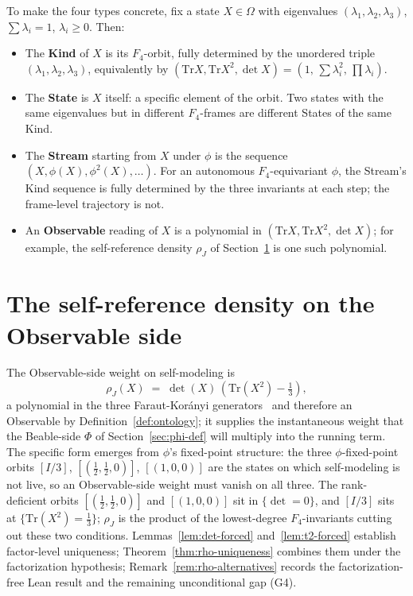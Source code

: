 \documentclass[12pt]{article}
\theoremstyle{remark}
\newcommand{\Ffour}{F_4}
\newcommand{\rhoJ}{\rho_J}
\newcommand{\Phiexp}{\Phi}
\newcommand{\Tr}{\mathrm{Tr}}
\begin{document}
To make the four types concrete, fix a state $X \in \Omega$ with
eigenvalues $(\lambda_1, \lambda_2, \lambda_3)$, $\sum \lambda_i = 1$,
$\lambda_i \geq 0$. Then:
\begin{itemize}[leftmargin=2em]
\item The \textbf{Kind} of $X$ is its $\Ffour$-orbit, fully determined by
the unordered triple $(\lambda_1, \lambda_2, \lambda_3)$, equivalently by
$(\Tr X, \Tr X^2, \det X) = (1,\,\sum \lambda_i^2,\,\prod \lambda_i)$.
\item The \textbf{State} is $X$ itself: a specific element of the orbit.
Two states with the same eigenvalues but in different $\Ffour$-frames are
different States of the same Kind.
\item The \textbf{Stream} starting from $X$ under $\phi$ is the sequence
$(X, \phi(X), \phi^2(X), \ldots)$. For an autonomous $\Ffour$-equivariant
$\phi$, the Stream's Kind sequence is fully determined by the three
invariants at each step; the frame-level trajectory is not.
\item An \textbf{Observable} reading of $X$ is a polynomial in $(\Tr X,
\Tr X^2, \det X)$; for example, the self-reference density $\rhoJ$ of
Section~\ref{sec:rho-obs} is one such polynomial.
\end{itemize}


\section{The self-reference density on the Observable side}
\label{sec:rho-obs}

The Observable-side weight on self-modeling is
\begin{equation*}
  \rhoJ(X) \;=\; \det(X)\,(\Tr(X^2) - \tfrac{1}{3}),
\end{equation*}
a polynomial in the three Faraut-Kor\'anyi
generators~\cite{faraut-koranyi1994} and therefore an Observable by
Definition~\ref{def:ontology}; it supplies the instantaneous weight
that the Beable-side $\Phiexp$ of Section~\ref{sec:phi-def} will
multiply into the running term. The specific form emerges from
$\phi$'s fixed-point structure: the three $\phi$-fixed-point orbits
$[I/3]$, $[(\tfrac{1}{2}, \tfrac{1}{2}, 0)]$, $[(1,0,0)]$ are the
states on which self-modeling is not live, so an Observable-side
weight must vanish on all three. The rank-deficient orbits
$[(\tfrac{1}{2}, \tfrac{1}{2}, 0)]$ and $[(1,0,0)]$ sit in
$\{\det = 0\}$, and $[I/3]$ sits at $\{\Tr(X^2) = \tfrac{1}{3}\}$;
$\rhoJ$ is the product of the lowest-degree $\Ffour$-invariants
cutting out these two conditions.
Lemmas~\ref{lem:det-forced} and~\ref{lem:t2-forced} establish
factor-level uniqueness; Theorem~\ref{thm:rho-uniqueness} combines
them under the factorization hypothesis;
Remark~\ref{rem:rho-alternatives} records the factorization-free Lean
result and the remaining unconditional gap (G4).
\end{document}
